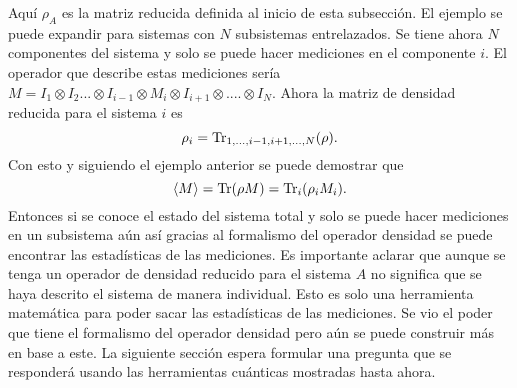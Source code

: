 Aquí $\rho_{A}$ es la matriz reducida definida al inicio de esta subsección. El ejemplo se puede expandir para sistemas con $N$ subsistemas entrelazados. Se tiene ahora $N$ componentes del sistema y solo se puede hacer mediciones en el componente $i$. El operador que describe estas mediciones sería $M= I_{1}\otimes I_{2} ... \otimes I_{i-1} \otimes M_{i} \otimes I_{i+1}\otimes .... \otimes I_{N}$. Ahora la matriz de densidad reducida para el sistema $i$ es
\begin{equation}
\rho_{i}= \Tr_{1,...,i-1,i+1,...,N}(\rho).
\end{equation}
Con esto y siguiendo el ejemplo anterior se puede demostrar que  \cite{Decoherence}
\begin{equation}
\langle M \rangle = \Tr(\rho M)=\Tr_{i}(\rho_{i} M_{i}).
\end{equation}
Entonces si se conoce el estado del sistema total y solo se puede hacer mediciones en un subsistema aún así gracias al formalismo del operador densidad se puede encontrar las estadísticas de las mediciones. Es importante aclarar que aunque se tenga un operador de densidad reducido para el sistema $A$ no significa que se haya descrito el sistema de manera individual. Esto es solo una herramienta matemática para poder sacar las estadísticas de las mediciones. Se vio el poder que tiene el formalismo del operador densidad pero aún se puede construir más en base a este. La siguiente sección espera formular una pregunta que se responderá usando las herramientas cuánticas mostradas hasta ahora.
